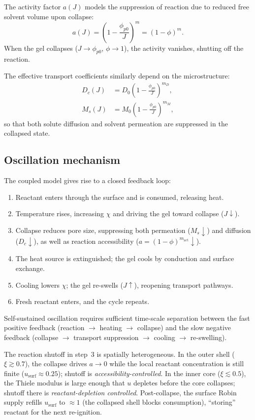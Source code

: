 \documentclass[aps,pre,reprint,superscriptaddress,longbibliography,floatfix]{revtex4-2}
\newcommand{\pp}{\phi_{p0}}
\begin{document}
The activity factor $a(J)$ models the suppression of reaction due to reduced free solvent volume upon collapse:
\begin{equation}
  a(J) = \left(1 - \frac{\pp}{J}\right)^m = (1-\phi)^m.
  \label{eq:aJ}
\end{equation}
When the gel collapses ($J\to\pp$, $\phi\to 1$), the activity vanishes, shutting off the reaction.

The effective transport coefficients similarly depend on the microstructure:
\begin{align}
  D_c(J) &= D_0\left(1-\frac{\pp}{J}\right)^{m_D}, \label{eq:Dc} \\
  M_s(J) &= M_0\left(1-\frac{\pp}{J}\right)^{m_M}, \label{eq:Ms}
\end{align}
so that both solute diffusion and solvent permeation are suppressed in the collapsed state.

\subsection{Oscillation mechanism}

The coupled model gives rise to a closed feedback loop:
\begin{enumerate}
  \item Reactant enters through the surface and is consumed, releasing heat.
  \item Temperature rises, increasing $\chi$ and driving the gel toward collapse ($J\downarrow$).
  \item Collapse reduces pore size, suppressing both permeation ($M_s\downarrow$) and diffusion ($D_c\downarrow$), as well as reaction accessibility ($a=(1-\phi)^{m_\mathrm{act}}\downarrow$).
  \item The heat source is extinguished; the gel cools by conduction and surface exchange.
  \item Cooling lowers $\chi$; the gel re-swells ($J\uparrow$), reopening transport pathways.
  \item Fresh reactant enters, and the cycle repeats.
\end{enumerate}
Self-sustained oscillation requires sufficient time-scale separation between the fast positive feedback (reaction $\to$ heating $\to$ collapse) and the slow negative feedback (collapse $\to$ transport suppression $\to$ cooling $\to$ re-swelling).

The reaction shutoff in step~3 is spatially heterogeneous. In the outer
shell ($\xi\gtrsim 0.7$), the collapse drives $a\to 0$ while the local
reactant concentration is still finite ($u_\mathrm{surf}\approx 0.25$);
shutoff is \emph{accessibility-controlled}. In the inner core
($\xi\lesssim 0.5$), the Thiele modulus is large enough that $u$ depletes
before the core collapses; shutoff there is \emph{reactant-depletion
controlled}. Post-collapse, the surface Robin supply refills $u_\mathrm{surf}$
to $\approx 1$ (the collapsed shell blocks consumption), ``storing'' reactant
for the next re-ignition.
\end{document}
